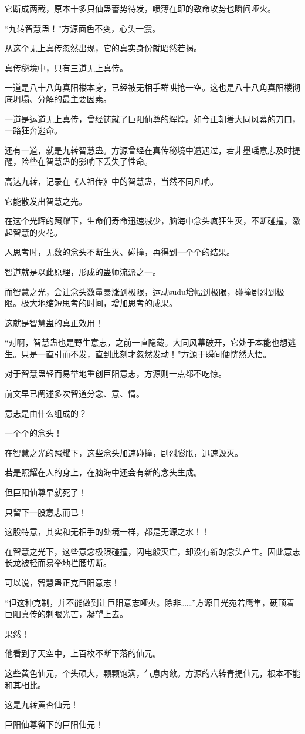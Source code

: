 \begin{this_body}
它断成两截，原本十多只仙蛊蓄势待发，喷薄在即的致命攻势也瞬间哑火。

“九转智慧蛊！”方源面色不变，心头一震。

从这个无上真传忽然出现，它的真实身份就昭然若揭。

真传秘境中，只有三道无上真传。

一道是八十八角真阳楼本身，已经被无相手群哄抢一空。这也是八十八角真阳楼彻底坍塌、分解的最主要因素。

一道是运道无上真传，曾经铸就了巨阳仙尊的辉煌。如今正朝着大同风幕的刀口，一路狂奔逃命。

还有一道，就是九转智慧蛊。方源曾经在真传秘境中遭遇过，若非墨瑶意志及时提醒，险些在智慧蛊的影响下丢失了性命。

高达九转，记录在《人祖传》中的智慧蛊，当然不同凡响。

它能散发出智慧之光。

在这个光辉的照耀下，生命们寿命迅速减少，脑海中念头疯狂生灭，不断碰撞，激起智慧的火花。

人思考时，无数的念头不断生灭、碰撞，再得到一个个的结果。

智道就是以此原理，形成的蛊师流派之一。

而智慧之光，会让念头数量暴涨到极限，运动sudu增幅到极限，碰撞剧烈到极限。极大地缩短思考的时间，增加思考的成果。

这就是智慧蛊的真正效用！

“对啊，智慧蛊也是野生意志，之前一直隐藏。大同风幕破开，它处于本能也想逃生。只是一直引而不发，直到此刻才忽然发动！”方源于瞬间便恍然大悟。

对于智慧蛊轻而易举地重创巨阳意志，方源则一点都不吃惊。

前文早已阐述多次智道分念、意、情。

意志是由什么组成的？

一个个的念头！

在智慧之光的照耀下，这些念头加速碰撞，剧烈膨胀，迅速毁灭。

若是照耀在人的身上，在脑海中还会有新的念头生成。

但巨阳仙尊早就死了！

只留下一股意志而已！

这股特意，其实和无相手的处境一样，都是无源之水！！

在智慧之光下，这些意念极限碰撞，闪电般灭亡，却没有新的念头产生。因此意志长龙被轻而易举地拦腰切断。

可以说，智慧蛊正克巨阳意志！

“但这种克制，并不能做到让巨阳意志哑火。除非……”方源目光宛若鹰隼，硬顶着巨阳真传的刺眼光芒，凝望上去。

果然！

他看到了天空中，上百枚不断下落的仙元。

这些黄色仙元，个头硕大，颗颗饱满，气息内敛。方源的六转青提仙元，根本不能和其相比。

这是九转黄杏仙元！

巨阳仙尊留下的巨阳仙元！

\end{this_body}


